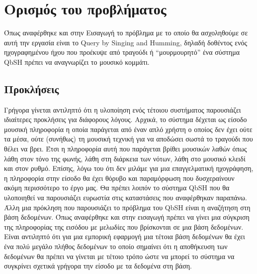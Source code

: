 \section{Ορισμός του προβλήματος}
Όπως αναφέρθηκε και στην Εισαγωγή το πρόβλημα με το οποίο θα ασχοληθούμε σε
αυτή την εργασία είναι το Query by Singing and Humming, δηλαδή δοθέντος ενός
ηχογραφημένου ήχου που προέκυψε από τραγούδι ή “μουρμουρητό” ένα σύστημα QbSH
πρέπει να αναγνωρίζει το μουσικό κομμάτι.

\subsection{Προκλήσεις}
Γρήγορα γίνεται αντιληπτό ότι η υλοποίηση ενός τέτοιου συστήματος παρουσιάζει
ιδιαίτερες προκλήσεις για διάφορους λόγους. Αρχικά, το σύστημα δέχεται ως
είσοδο μουσική πληροφορία η οποία παράγεται από έναν απλό χρήστη ο οποίος δεν
έχει ούτε τα μέσα, ούτε (συνήθως) τη μουσική τεχνική για να αποδώσει σωστά το
τραγούδι που θέλει να βρει. Έτσι η πληροφορία αυτή που παράγεται βρίθει
μουσικών λαθών όπως λάθη στον τόνο της φωνής, λάθη στη διάρκεια των νότων,
λάθη στο μουσικό κλειδί και στον ρυθμό. Επίσης, λόγω του ότι δεν μιλάμε για
μια επαγγελματική ηχογράφηση, η πληροφορία στην είσοδο θα έχει θόρυβο και
παραμόρφωση που δυσχεραίνουν ακόμη περισσότερο το έργο μας. Θα πρέπει λοιπόν
το σύστημα QbSH που θα υλοποιηθεί να παρουσιάζει ευρωστία στις καταστάσεις που
αναφέρθηκαν παραπάνω.
\newline
Άλλη μια πρόκληση που παρουσιάζει το πρόβλημα του QbSH είναι η αναζήτηση στη
βάση δεδομένων. Όπως αναφέρθηκε και στην εισαγωγή πρέπει να γίνει μια σύγκριση
 της πληροφορίας της εισόδου με μελωδίες που βρίσκονται σε μια βάση δεδομένων.
 Είναι αντιληπτό ότι για μια εμπορική εφαρμογή μια τέτοια βάση δεδομένων θα
 έχει ένα πολύ μεγάλο πλήθος δεδομένων το οποίο σημαίνει ότι η αποθήκευση των
  δεδομένων θα πρέπει να γίνεται με τέτοιο τρόπο ώστε να μπορεί το σύστημα
  να συγκρίνει σχετικά γρήγορα την είσοδο με τα δεδομένα στη βάση.
